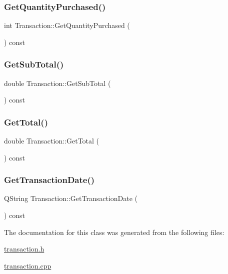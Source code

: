 \mbox{\label{class_transaction_a3edb74863df1a30670611c0d8b50a0fb}} 
\subsubsection{\texorpdfstring{Get\+Quantity\+Purchased()}{GetQuantityPurchased()}}
{\footnotesize\ttfamily int Transaction\+::\+Get\+Quantity\+Purchased (\begin{DoxyParamCaption}{ }\end{DoxyParamCaption}) const}

\mbox{\label{class_transaction_afa1626bf3906a25d6c53aace91b4458f}} 
\subsubsection{\texorpdfstring{Get\+Sub\+Total()}{GetSubTotal()}}
{\footnotesize\ttfamily double Transaction\+::\+Get\+Sub\+Total (\begin{DoxyParamCaption}{ }\end{DoxyParamCaption}) const}

\mbox{\label{class_transaction_ab70e25b411284645e6ebe69e6d26f69f}} 
\subsubsection{\texorpdfstring{Get\+Total()}{GetTotal()}}
{\footnotesize\ttfamily double Transaction\+::\+Get\+Total (\begin{DoxyParamCaption}{ }\end{DoxyParamCaption}) const}

\mbox{\label{class_transaction_abc9ae64b163a7956d13c4ac11c8a5f55}} 
\subsubsection{\texorpdfstring{Get\+Transaction\+Date()}{GetTransactionDate()}}
{\footnotesize\ttfamily Q\+String Transaction\+::\+Get\+Transaction\+Date (\begin{DoxyParamCaption}{ }\end{DoxyParamCaption}) const}



The documentation for this class was generated from the following files\+:\begin{DoxyCompactItemize}
\item 
\hyperlink{transaction_8h}{transaction.\+h}\item 
\hyperlink{transaction_8cpp}{transaction.\+cpp}\end{DoxyCompactItemize}
